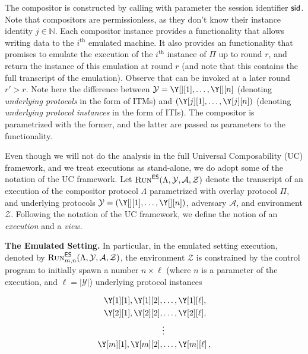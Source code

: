 The compositor is constructed by calling \emph{\construct} with parameter the session identifier $\textsf{sid}$.
Note that compositors are permissionless, as they don't know their instance identity $j \in \mathbb{N}$.
Each compositor instance provides a \emph{\writeToMachine}
functionality that allows writing data to the $i^\text{th}$ emulated machine.
It also provides an \emph{\emulateMachine} functionality that promises to emulate the execution of
the $i^\text{th}$ instance of $\Pi$ up to round $r$, and return the instance of this emulation
at round $r$ (and note that this contains the full transcript of the emulation).
Observe that \emph{\emulateMachine} can be invoked at a later round $r' > r$.
Note here the difference between $\mathcal{Y} = \Y[][1], \ldots, \Y[][n]$ (denoting \emph{underlying protocols}
in the form of ITMs) and
$(\Y[j][1], \ldots, \Y[j][n])$ (denoting \emph{underlying protocol instances}
in the form of ITIs). The compositor is parametrized with the former, and
the latter are passed as parameters to the \emph{\construct} functionality.

Even though we will not do the analysis in the full Universal Composability (UC) framework, and
we treat executions as stand-alone, we do adopt some of the notation of the UC framework.
Let $\textsc{Run}^{\textsf{ES}}(\Lambda, \mathcal{Y}, \mathcal{A}, \mathcal{Z})$
denote the transcript of an execution of the compositor protocol $\Lambda$ parametrized with overlay protocol $\Pi$,
and underlying protocols $\mathcal{Y} = (\Y[][1], \ldots, \Y[][n])$, adversary $\mathcal{A}$, and environment $\mathcal{Z}$.
Following the notation of the UC framework, we define the notion of an \emph{execution}
and a \emph{view}.

\noindent
\textbf{The Emulated Setting.}
In particular, in the emulated setting execution, denoted by $\textsc{Run}^{\textsf{ES}}_{m,n}(\Lambda, \mathcal{Y}, \mathcal{A}, \mathcal{Z})$,
the environment $\mathcal{Z}$ is constrained by the control program
to initially
spawn a number $n \times \ell$ (where $n$ is a parameter of the execution,
and $\ell = |\mathcal{Y}|$)
underlying protocol instances

\begin{align*}
\Y[1][1], \Y[1][2], &\ldots, \Y[1][\ell],\\
\Y[2][1], \Y[2][2], &\ldots, \Y[2][\ell],\\
                    &\vdots              \\
\Y[m][1], \Y[m][2], &\ldots, \Y[m][\ell]\,,
\end{align*}

